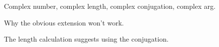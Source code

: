 Complex number, complex length, complex conjugation, complex arg.

Why the obvious extension won't work.

The length calculation suggests using the conjugation.




\endinput
% 